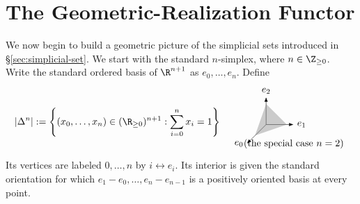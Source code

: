 
\section{The Geometric-Realization Functor}\label{sec:geom-realization}
\hypertarget{o014.aljabr2.chapter8.geometric-realization}{ }
We now begin to build a geometric picture of the simplicial sets introduced
in \S\ref{sec:simplicial-set}. We start with the standard $n$-simplex, where
$n\in\Z_{\geq0}$. Write the standard ordered basis of $\R^{n+1}$ as
$e_0,\ldots,e_n$. Define
\[
|\Delta^n| := \left\{ (x_0, \ldots, x_n) \in (\R_{\geq 0})^{n+1} : \sum_{i=0}^n x_i = 1 \right\} \quad
\begin{tikzpicture}[baseline=(O)]
	\coordinate (O) at (0, 0);
	\draw[-Latex] (0, 0) -- (-0.7, -0.7) node[left] {$e_0$};
	\draw[-Latex] (0, 0) -- (1, 0) node[right] {$e_1$};
	\draw[-Latex] (0, 0) -- (0, 1) node [above] {$e_2$};
	\fill[color=gray, opacity=0.4] (-0.4, -0.4) -- (0.75, 0) -- (0, 0.75) --cycle;
	\node at (1, -0.7) {(the special case $n=2$)};
\end{tikzpicture}
\]
Its vertices are labeled $0,\ldots,n$ by $i\leftrightarrow e_i$. Its
interior is given the standard orientation for which
$e_1-e_0,\ldots,e_n-e_{n-1}$ is a positively oriented basis at every point.

